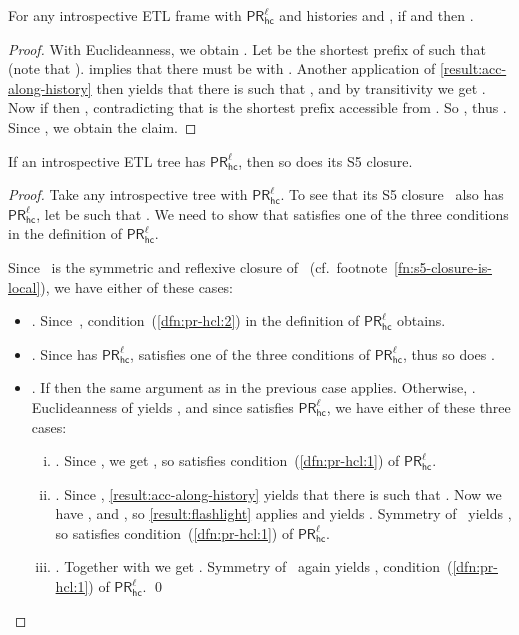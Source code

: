 \documentclass{article}
\newcommand{\PRhcl}{\ensuremath{\mathsf{PR_{hc}^\ell}}\xspace}
\newcounter{#1}
\newcommand{\qedhere}{\qed}
\begin{document}
\begin{lemma}\label{result:flashlight}
  For any introspective ETL frame with \PRhcl and
  histories  and , if  and 
  then .
\end{lemma}
\begin{proof}
  With Euclideanness, we obtain .
  Let  be the shortest prefix of  such that  (note that ).
   implies that there must be  with .
  Another application of \cref{result:acc-along-history} then yields that
  there is  such that ,
  and by transitivity we get .
  Now if  then ,
  contradicting that  is the shortest prefix accessible from .
  So , thus .
  Since , we obtain the claim.
\end{proof}

\begin{lemma}
  \label{result:pr-hcl-preserved-under-s5-closure}
  If an introspective ETL tree has \PRhcl, then so does its S5 closure.
\end{lemma}
\begin{proof}
  Take any introspective tree \F with \PRhcl.
  To see that its S5 closure~ also has \PRhcl, let  be such that .
  We need to show that  satisfies one of the three conditions in the definition of \PRhcl.

  Since~ is the symmetric and reflexive closure of~
  (cf.~footnote~\ref{fn:s5-closure-is-local}),
  we have either of these cases:
  \begin{itemize}
  \item .
    Since~, condition~(\ref{dfn:pr-hcl:2}) in the definition of \PRhcl obtains.
  \item .
    Since \F has \PRhcl,  satisfies one of the three conditions of \PRhcl, thus so does .
  \item .
    If  then the same argument as in the previous case applies.
    Otherwise, .
    Euclideanness of  yields ,
    and since  satisfies \PRhcl, we have either of these three cases:
    \begin{enumerate}[(i)]
    \item .
      Since , we get ,
      so  satisfies condition~(\ref{dfn:pr-hcl:1}) of \PRhcl.
    \item .
      Since ,
      \cref{result:acc-along-history} yields that there is 
      such that .
      Now we have ,  and ,
      so \cref{result:flashlight} applies and yields .
      Symmetry of~ yields ,
      so  satisfies condition~(\ref{dfn:pr-hcl:1}) of \PRhcl.
    \item .
      Together with  we get .
      Symmetry of~ again yields ,
      condition~(\ref{dfn:pr-hcl:1}) of \PRhcl. \qedhere
    \end{enumerate}
  \end{itemize}
\end{proof}
\end{document}
